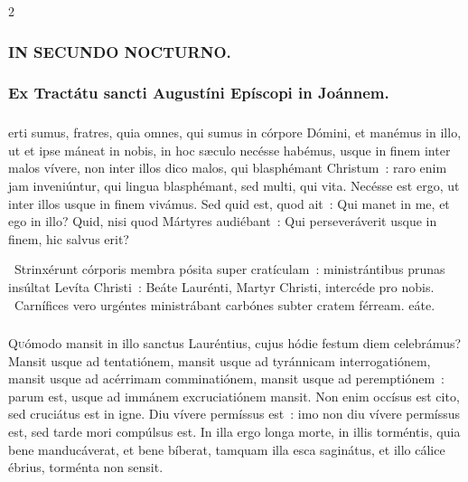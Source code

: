 \documentclass[9pt,twoside]{extarticle}
\begin{document}
\begin{multicols}{2}
{\subsubsection*{\center \textsc{IN SECUNDO NOCTURNO.}}
\subsubsection*{\center Ex Tractátu sancti Augustíni Epíscopi in Joánnem.}
\subsubsection*{\center {}}
erti sumus, fratres, quia omnes, qui sumus in córpore Dómini, et manémus in illo, ut et ipse máneat in nobis, in hoc sæculo necésse habémus, usque in finem inter malos vívere, non inter illos dico malos, qui blasphémant Christum~: raro enim jam inveniúntur, qui lingua blasphémant, sed multi, qui vita. Necésse est ergo, ut inter illos usque in finem vivámus. Sed quid est, quod ait~: Qui manet in me, et ego in illo?  Quid, nisi quod Mártyres audiébant~: Qui perseveráverit usque in finem, hic salvus erit?

\begin{tightlist}{}
\item {}~Strinxérunt córporis membra pósita super cratículam~: ministrántibus prunas insúltat Levíta Christi~: \textred{*} Beáte Laurénti, Martyr Christi, intercéde pro nobis.
~Carnífices vero urgéntes ministrábant carbónes subter cratem férream. eáte.
\end{tightlist}

\subsubsection*{\center {}}
\lettrine{Q}uómodo mansit in illo sanctus Lauréntius, cujus hódie festum diem celebrámus? Mansit usque ad tentatiónem, mansit usque ad tyránnicam interrogatiónem, mansit usque ad acérrimam comminatiónem, mansit usque ad peremptiónem~: parum est, usque ad immánem excruciatiónem mansit. Non enim occísus est cito, sed cruciátus est in igne. Diu vívere permíssus est~: imo non diu vívere permíssus est, sed tarde mori compúlsus est. In illa ergo longa morte, in illis torméntis, quia bene manducáverat, et bene bíberat, tamquam illa esca saginátus, et illo cálice ébrius, torménta non sensit.

}
\end{multicols}
\end{document}
